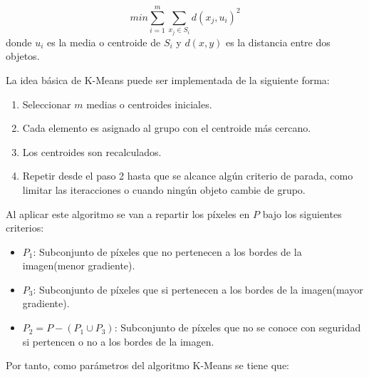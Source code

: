 \documentclass[a4paper,10pt,twocolumn]{article}
\begin{document}
\begin{equation}
	min \sum_{i=1}^m \sum_{x_j \in S_i} d(x_j, u_i)^2
\end{equation}
donde $u_i$ es la media o centroide de $S_i$ y $d(x, y)$ es la distancia entre dos objetos.

La idea b\'asica de K-Means puede ser implementada de la siguiente forma:

\begin{enumerate} 
\item {Seleccionar $m$ medias o centroides iniciales.}
\item {Cada elemento es asignado al grupo con el centroide m\'as cercano.}
\item {Los centroides son recalculados.}
\item {Repetir desde el paso 2 hasta que se alcance alg\'un criterio de parada, como limitar las iteracciones o cuando ning\'un objeto cambie de grupo.}
\end{enumerate}

Al aplicar este algoritmo se van a repartir los p\'ixeles en $P$ bajo los siguientes criterios:

\begin{itemize} 
\item $P_1$: Subconjunto de p\'ixeles que no pertenecen a los bordes de la imagen(menor gradiente). 
\item $P_3$: Subconjunto de p\'ixeles que si pertenecen a los bordes de la imagen(mayor gradiente).
\item $P_2 = P - (P_1 \cup P_3)$: Subconjunto de p\'ixeles que no se conoce con seguridad si pertencen o no a los bordes de la imagen. 
\end{itemize}

Por tanto, como par\'ametros del algoritmo K-Means se tiene que:
\end{document}
